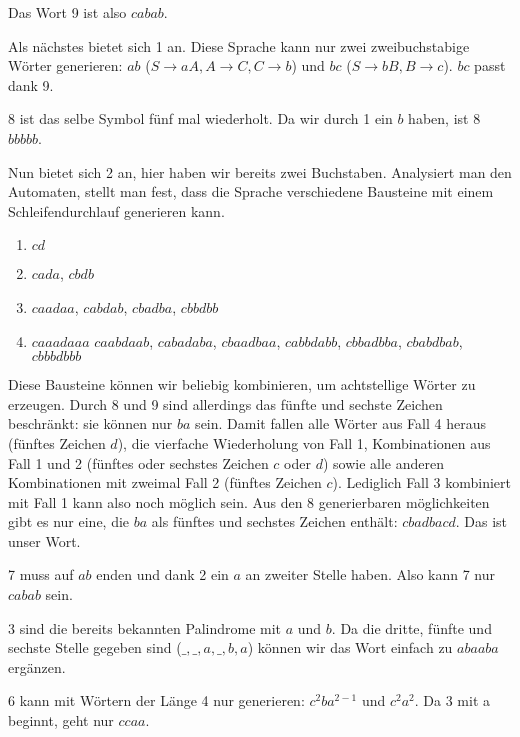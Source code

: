 \documentclass{article}
\begin{document}
Das Wort 9 ist also $cabab$.

\bigskip

Als nächstes bietet sich 1 an. Diese Sprache kann nur zwei zweibuchstabige Wörter generieren: $ab$ ($S\rightarrow aA, A\rightarrow C, C\rightarrow b$) und $bc$ ($S\rightarrow bB, B\rightarrow c$). $bc$ passt dank 9.

\bigskip

8 ist das selbe Symbol fünf mal wiederholt. Da wir durch 1 ein $b$ haben, ist 8 $bbbbb$.

\bigskip

Nun bietet sich 2 an, hier haben wir bereits zwei Buchstaben.
Analysiert man den Automaten, stellt man fest, dass die Sprache verschiedene Bausteine mit einem Schleifendurchlauf generieren kann.
\begin{enumerate}
	\item $cd$
  \item $cada$, $cbdb$
  \item $caadaa$, $cabdab$, $cbadba$, $cbbdbb$
  \item $caaadaaa$ $caabdaab$, $cabadaba$, $cbaadbaa$, $cabbdabb$, $cbbadbba$, $cbabdbab$, $cbbbdbbb$
\end{enumerate}
Diese Bausteine können wir beliebig kombinieren, um achtstellige Wörter zu erzeugen. Durch 8 und 9 sind allerdings das fünfte und sechste Zeichen beschränkt: sie können nur $ba$ sein.
Damit fallen alle Wörter aus Fall 4 heraus (fünftes Zeichen $d$), die vierfache Wiederholung von Fall 1, Kombinationen aus Fall 1 und 2 (fünftes oder sechstes Zeichen $c$ oder $d$) sowie alle anderen Kombinationen mit zweimal Fall 2 (fünftes Zeichen $c$).
Lediglich Fall 3 kombiniert mit Fall 1 kann also noch möglich sein. Aus den 8 generierbaren möglichkeiten gibt es nur eine, die $ba$ als fünftes und sechstes Zeichen enthält: $cbadbacd$. Das ist unser Wort.

\bigskip

7 muss auf $ab$ enden und dank 2 ein $a$ an zweiter Stelle haben. Also kann 7 nur $cabab$ sein.

\bigskip

3 sind die bereits bekannten Palindrome mit $a$ und $b$. Da die dritte, fünfte und sechste Stelle gegeben sind ($\_,\_,a,\_,b,a$) können wir das Wort einfach zu $abaaba$ ergänzen.

\bigskip

6 kann mit Wörtern der Länge 4 nur generieren: $c^2ba^{2-1}$ und $c^2a^2$. Da 3 mit a beginnt, geht nur $ccaa$.
\end{document}
